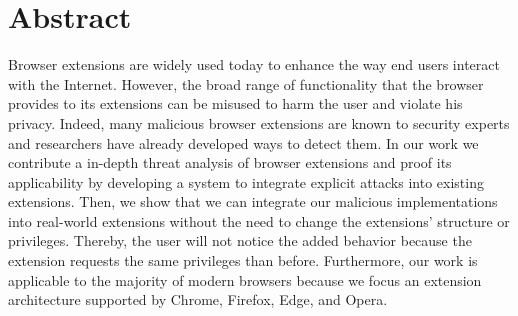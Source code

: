 \documentclass[parskip=full,bigchapter,linedtoc,colorback,accentcolor=tud9c,type=bsc]{tudthesis}
\begin{document}
	
	\author{Arno Manfred Krause}
	\makethesistitle
	
	
	\section*{Abstract}
	
	Browser extensions are widely used today to enhance the way end users interact with the Internet. However, the broad range of functionality that the browser provides to its extensions can be misused to harm the user and violate his privacy. Indeed, many malicious browser extensions are known to security experts and researchers have already developed ways to detect them. In our work we contribute a in-depth threat analysis of browser extensions and proof its applicability by developing a system to integrate explicit attacks into existing extensions. Then, we show that we can integrate our malicious implementations into real-world extensions without the need to change the extensions' structure or privileges. Thereby, the user will not notice the added behavior because the extension requests the same privileges than before. Furthermore, our work is applicable to the majority of modern browsers because we focus an extension architecture supported by Chrome, Firefox, Edge, and Opera.
	
	
	\tableofcontents
	\newpage
	
	
	
	
	
	
	
	
	
	
	
	
	
	
	
	
	
	
	
	
%
%
%
%
%


	\appendix
	
	
	
\end{document}
